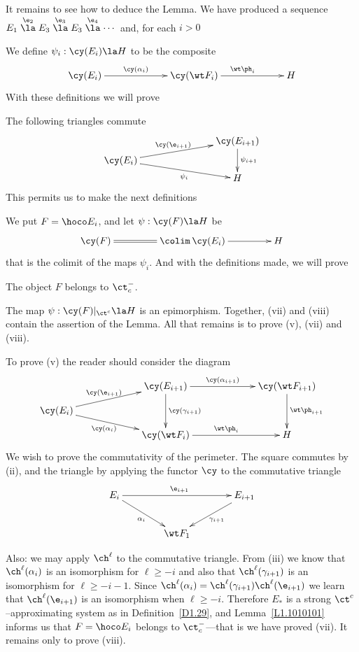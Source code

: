 \documentclass[11pt]{amsart}
\begin{document}
It remains to see how to deduce the Lemma. We have produced a sequence
$E_1\stackrel{\e_2}\la E_3\stackrel{\e_3}\la E_3\stackrel{\e_4}\la \cdots$
and, for each $i>0$
\be
\setcounter{enumi}{\value{enumiv}}
\item
We define $\psi_i:\cy(E_i)\la H$ to be the composite
\[\xymatrix@C+40pt{
\cy(E_{i}) \ar[r]^-{\cy(\alpha_{i})} &
\cy(\wt F_i) \ar[r]^{\wt\ph_i} & H
}\]
\setcounter{enumiv}{\value{enumi}}
\ee
With these definitions we will prove
\be
\setcounter{enumi}{\value{enumiv}}
\item
The following triangles commute
\[\xymatrix@C+50pt@R-20pt{
    & \cy(E_{i+1}) \ar[dd]^{\psi_{i+1}}\\
  \cy(E_i) \ar[rd]_-{\psi_i}
  \ar[ur]^-{\cy(\e_{i+1})} & \\
  & H
}\]
\setcounter{enumiv}{\value{enumi}}
\ee
This permits us to make the next definitions
\be
\setcounter{enumi}{\value{enumiv}}
\item
We put $F=\hoco E_i$, and let $\psi:\cy(F)\la H$ be
\[\xymatrix@C+20pt{
  \cy(F) \ar@{=}[r] &\colim\,\cy(E_i)\ar[r] & H
}\]
that is the colimit of the maps $\psi_i$.
\setcounter{enumiv}{\value{enumi}}
\ee
And with the definitions made, we will prove
\be
\setcounter{enumi}{\value{enumiv}}
\item
The object $F$ belongs to $\ct^-_c$.
\item
  The map $\psi:\cy(F)|_{\ct^c}\la H$ is an epimorphism.
\setcounter{enumiv}{\value{enumi}}
\ee
Together, (vii) and (viii) contain the assertion of the Lemma. All that remains
is to prove (v), (vii) and (viii).

To prove (v) the reader should consider the diagram
\[\xymatrix@C+40pt@R-15pt{
  &\cy(E_{i+1}) \ar[r]^-{\cy(\alpha_{i+1})}\ar[dd]^-{\cy(\gamma_{i+1})} & \cy(\wt F_{i+1}) \ar[dd]^{\wt\ph_{i+1}}\\
  \cy(E_{i}) \ar[ur]^-{\cy(\e_{i+1})}
  \ar[dr]_-{\cy(\alpha_{i})} & & \\
&\cy(\wt F_i) \ar[r]^{\wt\ph_i} & H
}\]
We wish to prove the commutativity
of the perimeter.
The square commutes by (ii), and the triangle by applying the
functor $\cy$ to the commutative triangle
\[\xymatrix@C+15pt{
E_i\ar[rr]^{\e_{i+1}}\ar[dr]_{\alpha_i}&  &\ar[dl]^{\gamma_{i+1}} E_{i+1}\\
& \wt F_1 &                
}\]

Also: we may apply $\ch^\ell$ to the commutative triangle.
 From (iii) we know that $\ch^\ell(\alpha_i)$
is an isomorphism for $\ell\geq-i$ and also that 
$\ch^\ell(\gamma_{i+1})$ is an isomorphism for $\ell\geq-i-1$. Since
$\ch^\ell(\alpha_i)=\ch^\ell(\gamma_{i+1})\ch^\ell(\e_{i+1})$
we learn that $\ch^\ell(\e_{i+1})$ is an isomorphism when $\ell\geq-i$.
Therefore $E_*$ is a strong $\ct^c$--approximating system as
in Definition~\ref{D1.29}, and Lemma~\ref{L1.1010101} informs
us that $F=\hoco E_i$ belongs to $\ct^-_c$---that is we have proved (vii).
It remains only to prove (viii).
\end{document}
